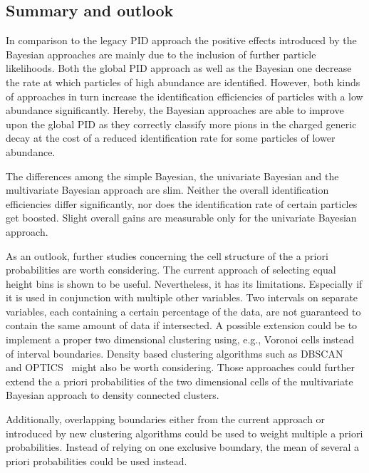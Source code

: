 \subsection{Summary and outlook}
\label{subsc:bayesian_approach_summary}

In comparison to the legacy PID approach the positive effects introduced by the Bayesian approaches are mainly due to the inclusion of further particle likelihoods. Both the global PID approach as well as the Bayesian one decrease the rate at which particles of high abundance are identified. However, both kinds of approaches in turn increase the identification efficiencies of particles with a low abundance significantly. Hereby, the Bayesian approaches are able to improve upon the global PID as they correctly classify more pions in the charged generic decay at the cost of a reduced identification rate for some particles of lower abundance.

The differences among the simple Bayesian, the univariate Bayesian and the multivariate Bayesian approach are slim. Neither the overall identification efficiencies differ significantly, nor does the identification rate of certain particles get boosted. Slight overall gains are measurable only for the univariate Bayesian approach.

As an outlook, further studies concerning the cell structure of the a priori probabilities are worth considering. The current approach of selecting equal height bins is shown to be useful. Nevertheless, it has its limitations. Especially if it is used in conjunction with multiple other variables. Two intervals on separate variables, each containing a certain percentage of the data, are not guaranteed to contain the same amount of data if intersected. A possible extension could be to implement a proper two dimensional clustering using, e.g., Voronoi cells instead of interval boundaries. Density based clustering algorithms such as DBSCAN~\cite{Ester:1996:DAD:3001460.3001507} and OPTICS~\cite{Ankerst99optics:ordering} might also be worth considering. Those approaches could further extend the a priori probabilities of the two dimensional cells of the multivariate Bayesian approach to density connected clusters.

Additionally, overlapping boundaries either from the current approach or introduced by new clustering algorithms could be used to weight multiple a priori probabilities. Instead of relying on one exclusive boundary, the mean of several a priori probabilities could be used instead.

